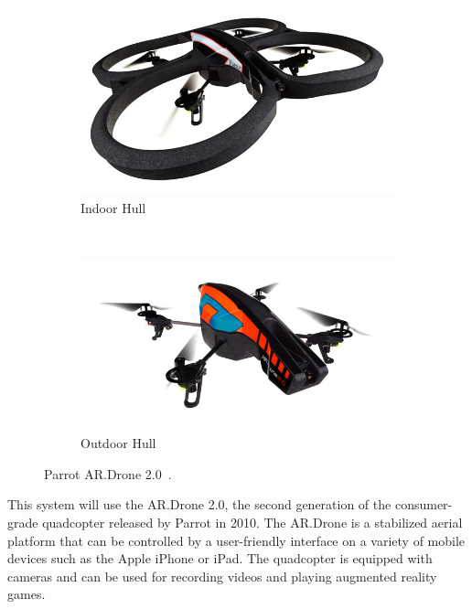     \begin{figure}[ht]
            \centering
            \begin{subfigure}[b]{0.5\textwidth}
                    \centering
                    \includegraphics[width=\textwidth]{../images/ardrone_indoor.jpg}
                    \caption{Indoor Hull}
                    \label{fig:indoor}
            \end{subfigure}%
            ~ %
            \begin{subfigure}[b]{0.5\textwidth}
                    \centering
                    \includegraphics[width=\textwidth]{../images/ardrone_outdoor.jpg}
                    \caption{Outdoor Hull}
                    \label{fig:outdoor}
            \end{subfigure}
            \caption{Parrot AR.Drone 2.0~\cite{ParrotPress}.}\label{fig:ardrone}
    \end{figure}

    This system will use the AR.Drone 2.0, the second generation of the consumer-grade quadcopter released by Parrot in 2010. The AR.Drone is a stabilized aerial platform that can be controlled by a user-friendly interface on a variety of mobile devices such as the Apple iPhone or iPad. The quadcopter is equipped with cameras and can be used for recording videos and playing augmented reality games.

